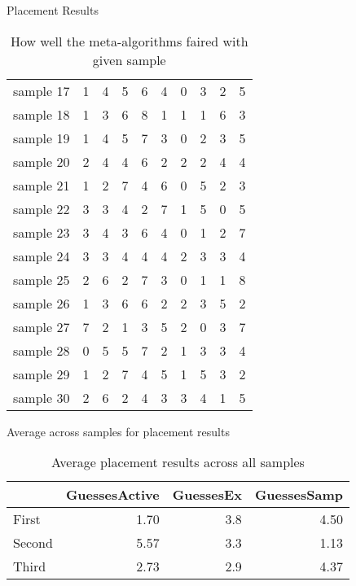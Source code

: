 \documentclass{beamer}
\begin{document}
\begin{frame}{Placement Results}
\begin{table}
\begin{tabular}{lrrrrrrrrr}
sample 17 &             1 &  4 &  5 &         6 &  4 &  0 &           3 &  2 &  5 \\
sample 18 &             1 &  3 &  6 &         8 &  1 &  1 &           1 &  6 &  3 \\
sample 19 &             1 &  4 &  5 &         7 &  3 &  0 &           2 &  3 &  5 \\
sample 20 &             2 &  4 &  4 &         6 &  2 &  2 &           2 &  4 &  4 \\
sample 21 &             1 &  2 &  7 &         4 &  6 &  0 &           5 &  2 &  3 \\
sample 22 &             3 &  3 &  4 &         2 &  7 &  1 &           5 &  0 &  5 \\
sample 23 &             3 &  4 &  3 &         6 &  4 &  0 &           1 &  2 &  7 \\
sample 24 &             3 &  3 &  4 &         4 &  4 &  2 &           3 &  3 &  4 \\
sample 25 &             2 &  6 &  2 &         7 &  3 &  0 &           1 &  1 &  8 \\
sample 26 &             1 &  3 &  6 &         6 &  2 &  2 &           3 &  5 &  2 \\
sample 27 &             7 &  2 &  1 &         3 &  5 &  2 &           0 &  3 &  7 \\
sample 28 &             0 &  5 &  5 &         7 &  2 &  1 &           3 &  3 &  4 \\
sample 29 &             1 &  2 &  7 &         4 &  5 &  1 &           5 &  3 &  2 \\
sample 30 &             2 &  6 &  2 &         4 &  3 &  3 &           4 &  1 &  5 \\
\bottomrule
\end{tabular}
\caption{Placement results}
\caption*{How well the meta-algorithms faired with given sample}
\end{table}
\end{frame}

\begin{frame}{Average across samples for placement results}
\begin{table}
\begin{tabular}{lrrr}
\toprule
{} &  GuessesActive &  GuessesEx &  GuessesSamp \\
\midrule
First  &           1.70 &        3.8 &         4.50 \\
Second &           5.57 &        3.3 &         1.13 \\
Third  &           2.73 &        2.9 &         4.37 \\
\bottomrule
\end{tabular}
\caption{Average placement results across all samples}
\end{table}
\end{frame}
\end{document}
